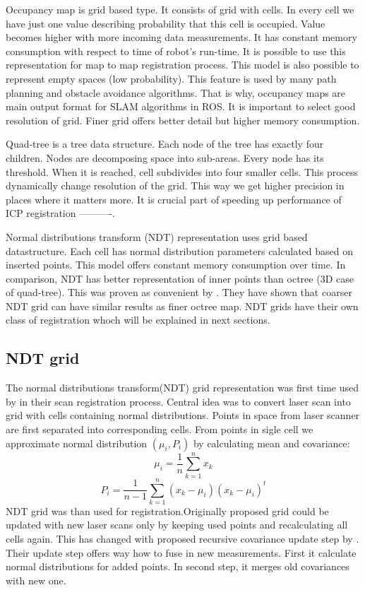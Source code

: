 Occupancy map is grid based type. It consists of grid with cells. In every cell we have just one value describing probability that this cell is occupied. Value becomes higher with more incoming data measurements. It has constant memory consumption with respect to time of robot's run-time. It is possible to use this representation for map to map registration process. This model is also possible to represent empty spaces (low probability). This feature is used by many path planning and obstacle avoidance algorithms. That is why, occupancy maps are main output format for SLAM algorithms in ROS. It is important to select good resolution of grid. Finer grid offers better detail but higher memory consumption.

Quad-tree is a tree data structure. Each node of the tree has exactly four children. Nodes are decomposing space into sub-areas. Every node has its threshold. When it is reached, cell subdivides into four smaller cells. This process dynamically change resolution of the grid. This way we get higher precision in places where it matters more. It is crucial part of speeding up performance of ICP registration  ----------.

Normal distributions transform (NDT) representation uses grid based datastructure. Each cell has normal distribution parameters calculated based on inserted points. This model offers constant memory consumption over time. In comparison, NDT has better representation of inner points than octree (3D case of quad-tree). This was proven as convenient by . They have shown that coarser NDT grid can have similar results as finer octree map. NDT grids have their own class of registration whoch will be explained in next sections.     
\newpage


\subsection{NDT grid}
\label{NDT_grid}
The normal distributions transform(NDT) grid representation was first time used by \cite{Biber03} in their scan registration process. Central idea was to convert laser scan into grid with cells containing normal distributions. Points in space from laser scanner are first separated into corresponding cells. From points in sigle cell we approximate normal distribution $(\mu_{i},P_{i})$ by calculating mean and covariance:
\begin{equation}
\mu_{i} = \dfrac{1}{n}\sum_{k=1}^{n}x_{k}
\end{equation}  
\begin{equation}
P_{i} = \dfrac{1}{n-1}\sum_{k=1}^{n}(x_{k}-\mu_{i})(x_{k}-\mu_{i})^{t}
\end{equation} 
NDT grid was than used for registration.Originally proposed grid could be updated with new laser scans only by keeping used points and recalculating all cells again. This has changed with proposed recursive covariance update step by \cite{Saarinen13}. Their update step offers way how to fuse in new measurements. First it calculate normal distributions for added points. In second step, it merges old covariances with new one.

